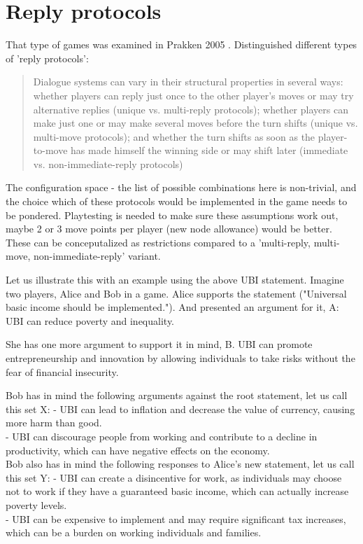 \documentclass{report}
\begin{document}
\section{Reply protocols}
That type of games was examined in Prakken 2005 \cite{prakken_coherence_2005}. Distinguished different types of 'reply protocols':
\begin{quotation}
  Dialogue systems can vary in their structural properties
in several ways: whether players can reply just once to the other player’s moves or may try
alternative replies (unique vs. multi-reply protocols); whether players can make just one or may
make several moves before the turn shifts (unique vs. multi-move protocols); and whether the turn
shifts as soon as the player-to-move has made himself the winning side or may shift later (immediate
vs. non-immediate-reply protocols)
\end{quotation}
\cite[page 1010]{prakken_coherence_2005}

The configuration space - the list of possible combinations here is non-trivial, and the choice which of these protocols would be implemented in the game needs to be pondered.
Playtesting is needed to make sure these assumptions work out, maybe 2 or 3 move points per player (new node allowance) would be better.
These can be conceputalized as restrictions compared to a 'multi-reply, multi-move, non-immediate-reply' variant.

Let us illustrate this with an example using the above UBI statement. Imagine two players, Alice and Bob in a game.
Alice supports the statement ("Universal basic income should be implemented."). And presented an argument for it, A:
UBI can reduce poverty and inequality.

She has one more argument to support it in mind, B.
UBI can promote entrepreneurship and innovation by allowing individuals to take risks without the fear of financial insecurity.

Bob has in mind the following arguments against the root statement, let us call this set X:
- UBI can lead to inflation and decrease the value of currency, causing more harm than good. \\
- UBI can discourage people from working and contribute to a decline in productivity, which can have  negative effects on the economy.\\

Bob also has in mind the following responses to Alice's new statement, let us call this set Y:
- UBI can create a disincentive for work, as individuals may choose not to work if they have a guaranteed basic income, which can actually increase poverty levels. \\
- UBI can be expensive to implement and may require significant tax increases, which can be a burden on working individuals and families. \\
\end{document}
